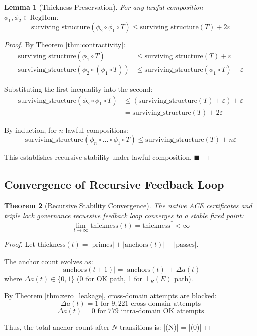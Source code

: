 \documentclass[11pt,a4paper]{article}
\newtheorem{theorem}{Theorem}[section]
\newtheorem{lemma}[theorem]{Lemma}
\begin{document}
\begin{lemma}[Thickness Preservation]\label{lemma:thickness_preservation}
For any lawful composition $\phi_1, \phi_2 \in \text{RegHom}$:
$$\text{surviving\_structure}(\phi_2 \circ \phi_1 \circ T) \leq \text{surviving\_structure}(T) + 2\varepsilon$$
\end{lemma}

\begin{proof}
By Theorem \ref{thm:contractivity}:
\begin{align}
\text{surviving\_structure}(\phi_1 \circ T) &\leq \text{surviving\_structure}(T) + \varepsilon \\
\text{surviving\_structure}(\phi_2 \circ (\phi_1 \circ T)) &\leq \text{surviving\_structure}(\phi_1 \circ T) + \varepsilon
\end{align}

Substituting the first inequality into the second:
\begin{align}
\text{surviving\_structure}(\phi_2 \circ \phi_1 \circ T) &\leq (\text{surviving\_structure}(T) + \varepsilon) + \varepsilon \\
&= \text{surviving\_structure}(T) + 2\varepsilon
\end{align}

By induction, for $n$ lawful compositions:
$$\text{surviving\_structure}(\phi_n \circ \dots \circ \phi_1 \circ T) \leq \text{surviving\_structure}(T) + n\varepsilon$$

This establishes recursive stability under lawful composition. \hfill $\blacksquare$
\end{proof}

\subsection{Convergence of Recursive Feedback Loop}

\begin{theorem}[Recursive Stability Convergence]\label{thm:recursive_convergence}
The native ACE certificates and triple lock governance recursive feedback loop converges to a stable fixed point:
$$\lim_{t \to \infty} \text{thickness}(t) = \text{thickness}^* < \infty$$
\end{theorem}

\begin{proof}
Let $\text{thickness}(t) = |\text{primes}| + |\text{anchors}(t)| + |\text{passes}|$.

The anchor count evolves as:
$$|\text{anchors}(t+1)| = |\text{anchors}(t)| + \Delta a(t)$$
where $\Delta a(t) \in \{0, 1\}$ (0 for OK path, 1 for $\bot_R(E)$ path).

By Theorem \ref{thm:zero_leakage}, cross-domain attempts are blocked:
$$\Delta a(t) = 1 \text{ for } 9,221 \text{ cross-domain attempts}$$
$$\Delta a(t) = 0 \text{ for } 779 \text{ intra-domain OK attempts}$$

Thus, the total anchor count after $N$ transitions is:
$$|(N)| = |(0)| 
\end{proof}

\nocite{*}
  

\end{document}
